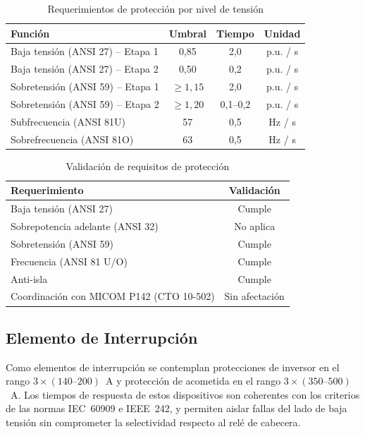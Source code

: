 \begin{table}[H]
    \centering
    \caption{Requerimientos de protección por nivel de tensión}
    \label{tab:cno_req}
    \begin{tabular}{lccc}
    \toprule
    \textbf{Función} & \textbf{Umbral} & \textbf{Tiempo} & \textbf{Unidad} \\
    \midrule
    Baja tensión (ANSI 27) -- Etapa 1 & 0,85 & 2,0 & p.u. / s \\
    Baja tensión (ANSI 27) -- Etapa 2 & 0,50 & 0,2 & p.u. / s \\
    Sobretensión (ANSI 59) -- Etapa 1 & $\geq 1{,}15$ & 2,0 & p.u. / s \\
    Sobretensión (ANSI 59) -- Etapa 2 & $\geq 1{,}20$ & 0,1--0,2 & p.u. / s \\
    Subfrecuencia (ANSI 81U) & 57 & 0,5 & Hz / s \\
    Sobrefrecuencia (ANSI 81O) & 63 & 0,5 & Hz / s \\
    \bottomrule
    \end{tabular}
\end{table}

\begin{table}[H]
    \centering
    \caption{Validación de requisitos de protección}
    \label{tab:cno_val}
    \begin{tabular}{lc}
    \toprule
    \textbf{Requerimiento} & \textbf{Validación} \\
    \midrule
    Baja tensión (ANSI 27) & Cumple \\
    Sobrepotencia adelante (ANSI 32) & No aplica \\
    Sobretensión (ANSI 59) & Cumple \\
    Frecuencia (ANSI 81 U/O) & Cumple \\
    Anti-isla & Cumple \\
    Coordinación con MICOM P142 (CTO 10-502) & Sin afectación \\
    \bottomrule
    \end{tabular}
\end{table}

\subsection{Elemento de Interrupción}

Como elementos de interrupción se contemplan protecciones de inversor en el rango $3\times(140\textrm{--}200)$~A y protección de acometida en el rango $3\times(350\textrm{--}500)$~A. Los tiempos de respuesta de estos dispositivos son coherentes con los criterios de las normas IEC~60909 e IEEE~242, y permiten aislar fallas del lado de baja tensión sin comprometer la selectividad respecto al relé de cabecera.


